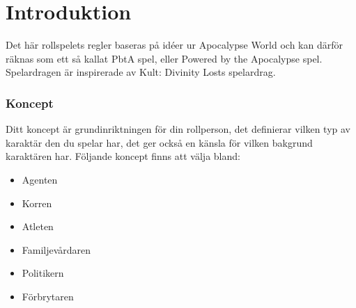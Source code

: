 \newcommand{\MyTitle}{Spelarbok}



\maketitle
\clearpage
\part{Introduktion}
Det här rollspelets regler baseras på idéer ur Apocalypse World och kan därför räknas som ett så kallat PbtA spel, eller Powered by the Apocalypse spel. Spelardragen är inspirerade av Kult: Divinity Losts spelardrag.
\section{Koncept}
Ditt koncept är grundinriktningen för din rollperson, det definierar vilken typ av karaktär den du spelar har, det ger också en känsla för vilken bakgrund karaktären har. Följande koncept finns att välja bland:
\begin{itemize}
  \item Agenten
  \item Korren
  \item Atleten
  \item Familjevårdaren
  \item Politikern
  \item Förbrytaren
\end{itemize}
